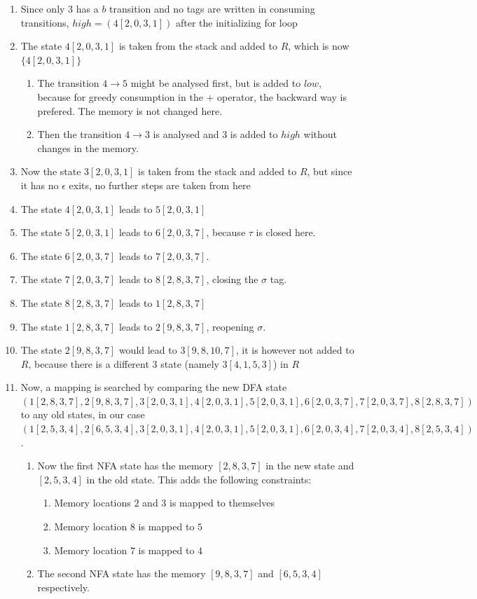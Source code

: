 \documentclass[english]{sigplanconf}
\theoremstyle{definition}
\begin{document}
\begin{enumerate}
\item Since only $3$ has a $b$ transition and no tags are written in consuming
transitions, $high=(4[2,0,3,1])$ after the initializing for loop
\item The state $4[2,0,3,1]$ is taken from the stack and added to $R$,
which is now $\{4[2,0,3,1]\}$ 

\begin{enumerate}
\item The transition $4\rightarrow5$ might be analysed first, but is added
to $low$, because for greedy consumption in the $+$ operator, the
backward way is prefered. The memory is not changed here.
\item Then the transition $4\rightarrow3$ is analysed and $3$ is added
to $high$ without changes in the memory.
\end{enumerate}
\item Now the state $3[2,0,3,1]$ is taken from the stack and added to $R$,
but since it has no $\epsilon$ exits, no further steps are taken
from here
\item The state $4[2,0,3,1]$ leads to $5[2,0,3,1]$
\item The state $5[2,0,3,1]$ leads to $6[2,0,3,7]$, because $\tau$ is
closed here.
\item The state $6[2,0,3,7]$ leads to $7[2,0,3,7]$.
\item The state $7[2,0,3,7]$ leads to $8[2,8,3,7]$, closing the $\sigma$
tag. 
\item The state $8[2,8,3,7]$ leads to $1[2,8,3,7]$
\item The state $1[2,8,3,7]$ leads to $2[9,8,3,7]$, reopening $\sigma$.
\item The state $2[9,8,3,7]$ would lead to $3[9,8,10,7]$, it is however
not added to $R$, because there is a different $3$ state (namely
$3[4,1,5,3]$) in $R$
\item Now, a mapping is searched by comparing the new DFA state $(1[2,8,3,7],2[9,8,3,7],3[2,0,3,1],4[2,0,3,1],5[2,0,3,1],6[2,0,3,7],7[2,0,3,7],8[2,8,3,7])$
to any old states, in our case $(1[2,5,3,4],2[6,5,3,4],3[2,0,3,1],4[2,0,3,1],5[2,0,3,1],6[2,0,3,4],7[2,0,3,4],8[2,5,3,4])$. 

\begin{enumerate}
\item Now the first NFA state has the memory $[2,8,3,7]$ in the new state
and $[2,5,3,4]$ in the old state. This adds the following constraints:

\begin{enumerate}
\item Memory locations $2$ and $3$ is mapped to themselves
\item Memory location $8$ is mapped to $5$
\item Memory location $7$ is mapped to $4$
\end{enumerate}
\item The second NFA state has the memory $[9,8,3,7]$ and $[6,5,3,4]$
respectively.


\end{enumerate}
\end{enumerate}
\end{document}
